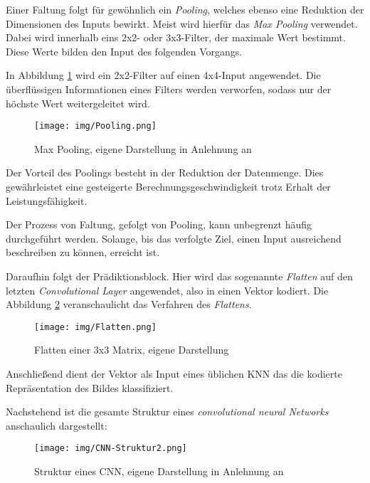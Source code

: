 Einer Faltung folgt für gewöhnlich ein \textit{Pooling}, welches ebenso eine Reduktion der Dimensionen des Inputs bewirkt. Meist wird hierfür das \textit{Max Pooling} verwendet. Dabei wird innerhalb eins 2x2- oder 3x3-Filter, der maximale Wert bestimmt. Diese Werte bilden den Input des folgenden Vorgangs. \cite[vgl.][S. 204]{13}

In Abbildung \ref{fig:Pooling} wird ein 2x2-Filter auf einen 4x4-Input angewendet. Die überflüssigen Informationen eines Filters werden verworfen, sodass nur der höchste Wert weitergeleitet wird.

\begin{figure}[H]
	\centering
	\texttt{[image: img/Pooling.png]}
	\caption{Max Pooling, eigene Darstellung in Anlehnung an \cite{28}}
	\label{fig:Pooling}
\end{figure}

Der Vorteil des Poolings besteht in der Reduktion der Datenmenge. Dies gewährleistet eine gesteigerte Berechnungsgeschwindigkeit trotz Erhalt der Leistungsfähigkeit. \cite[vgl.]{29}

Der Prozess von Faltung, gefolgt von Pooling, kann unbegrenzt häufig durchgeführt werden. Solange, bis das verfolgte Ziel, einen Input ausreichend beschreiben zu können, erreicht ist.
\cite[vgl.][]{27}

Daraufhin folgt der Prädiktionsblock. Hier wird das sogenannte \textit{Flatten} auf den letzten \textit{Convolutional Layer} angewendet, also in einen Vektor kodiert.
Die Abbildung \ref{fig:Flatten} veranschaulicht das Verfahren des \textit{Flattens}.

\begin{figure}[H]
	\centering
	\texttt{[image: img/Flatten.png]}
	\caption{Flatten einer 3x3 Matrix, eigene Darstellung}
	\label{fig:Flatten}
\end{figure}

Anschließend dient der Vektor als Input eines üblichen KNN \glqq das die kodierte Repräsentation des Bildes klassifiziert\grqq. \cite[S. 199]{13}

Nachstehend ist die gesamte Struktur eines \textit{convolutional neural Networks} anschaulich dargestellt:

\begin{figure}[H]
	\centering
	\texttt{[image: img/CNN-Struktur2.png]}
	\caption{Struktur eines CNN, eigene Darstellung in Anlehnung an \cite{13, 28}}
	\label{fig:CNN-Struktur}
\end{figure}

\cite[vgl.][]{13,27,28,29}
